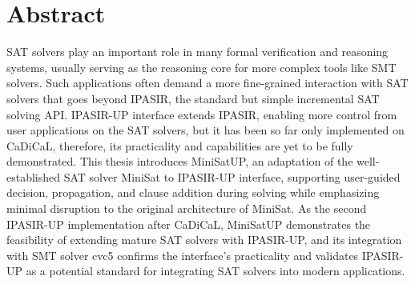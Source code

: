 \chapter*{Abstract}

SAT solvers play an important role in many formal verification and reasoning systems, usually serving as the reasoning core for more complex tools like SMT solvers. Such applications often demand a more fine-grained interaction with SAT solvers that goes beyond IPASIR, the standard but simple incremental SAT solving API. IPASIR-UP interface extends IPASIR, enabling more control from user applications on the SAT solvers, but it has been so far only implemented on CaDiCaL, therefore, its practicality and capabilities are yet to be fully demonstrated. This thesis introduces MiniSatUP, an adaptation of the well-established SAT solver MiniSat to IPASIR-UP interface, supporting user-guided decision, propagation, and clause addition during solving while emphasizing minimal disruption to the original architecture of MiniSat. As the second IPASIR-UP implementation after CaDiCaL, MiniSatUP demonstrates the feasibility of extending mature SAT solvers with IPASIR-UP, and its integration with SMT solver cvc5 confirms the interface's practicality and validates IPASIR-UP as a potential standard for integrating SAT solvers into modern applications.
